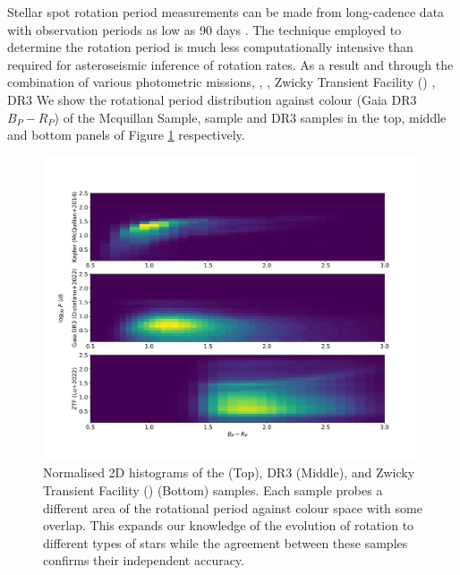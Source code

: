 Stellar spot rotation period measurements can be made from long-cadence data with observation periods as low as 90 days \citep{mcquillan_rotation_2014}.
The technique employed to determine the rotation period is much less computationally intensive than required for asteroseismic inference of rotation rates.
As a result and through the combination of various photometric missions, \kepler{} \citep{mcquillan_rotation_2014, santos_surface_2021}, \ktoo{} \citep{santos_surface_2021}, Zwicky Transient Facility (\ZTF) \citep{lu_bridging_2022}, \gaia{} DR3 \citep{distefano_gaia_2022} %
We show the rotational period distribution against colour (Gaia DR3 $B_P - R_P$) of the \kepler{} Mcquillan Sample, \ZTF{} sample and \gaia{} DR3 samples in the top, middle and bottom panels of Figure \ref{fig:rot_comp} respectively.

\begin{figure}[h]
    \includegraphics[width=\textwidth]{Figures/intro_figures/rot_comp.png}
    \caption{Normalised 2D histograms of the \kepler{} \citep{mcquillan_rotation_2014} (Top), \gaia{} DR3 \citep{distefano_gaia_2022} (Middle), and Zwicky Transient Facility (\ZTF) \citep{lu_bridging_2022} (Bottom) samples. Each sample probes a different area of the rotational period against colour space with some overlap. This expands our knowledge of the evolution of rotation to different types of stars while the agreement between these samples confirms their independent accuracy.}
    \label{fig:rot_comp}
\end{figure}

